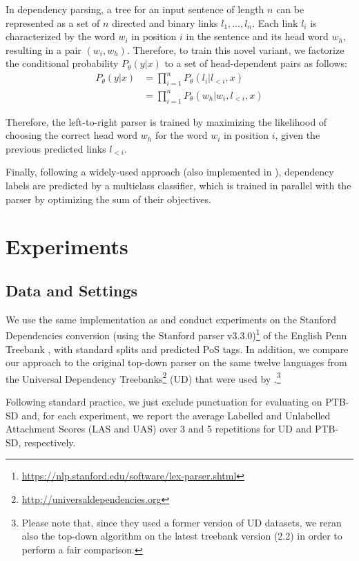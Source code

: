 \documentclass[11pt,a4paper]{article}
\begin{document}
In dependency parsing, a tree for an input sentence of length $n$ can be represented
as a set of $n$ directed and binary links $l_1, \dots , l_{n}$. Each link $l_i$ is characterized by the word $w_i$ in position $i$ in the sentence and its head word $w_h$, resulting in a pair $(w_i, w_h)$. Therefore, to train this novel variant, we factorize the conditional probability $P_\theta (y|x)$ to a set of head-dependent pairs as follows:
\begin{align*}
P_\theta (y|x) &= \prod_{i=1}^{n} P_\theta (l_i | l_{<i}, x) \\
&= \prod_{i=1}^{n} P_\theta (w_h | w_i,l_{<i},x) \end{align*}

\noindent Therefore, the left-to-right parser is trained by maximizing the likelihood of choosing the correct head word $w_h$ for the word $w_i$ in position $i$, given the previous predicted links $l_{<i}$.

Finally, following a widely-used approach (also implemented in \cite{Ma18}), dependency labels are predicted by a multiclass classifier, which is trained in parallel with the parser by optimizing the sum of their objectives.

\section{Experiments}
\subsection{Data and Settings}
We use the same implementation as \citet{Ma18} and conduct experiments on the Stanford Dependencies \cite{deMarneffe2008} conversion (using the Stanford parser v3.3.0)\footnote{\url{https://nlp.stanford.edu/software/lex-parser.shtml}} of the English Penn Treebank \cite{marcus93}, with standard splits and predicted PoS tags. In addition, we compare our approach to the original top-down parser on the same twelve languages from the Universal Dependency Treebanks\footnote{\url{http://universaldependencies.org}} (UD) that were used by \citet{Ma18}.\footnote{Please note that, since they used a former version of UD datasets, we reran also the top-down algorithm on the latest treebank version (2.2) in order to perform a fair comparison.} 

Following standard practice, we just exclude punctuation for evaluating on PTB-SD and, for each experiment, we report the average Labelled and Unlabelled Attachment Scores (LAS and UAS) over 3 and 5 repetitions for UD and PTB-SD, respectively. 
\end{document}
